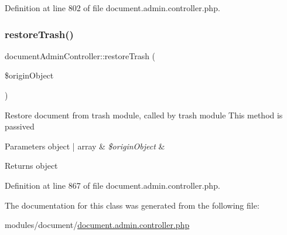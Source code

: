 Definition at line 802 of file document.\+admin.\+controller.\+php.

\mbox{\label{classdocumentAdminController_a3750ffc8b40a8bbd46f5ac455e65cb37}} 
\subsubsection{\texorpdfstring{restore\+Trash()}{restoreTrash()}}
{\footnotesize\ttfamily document\+Admin\+Controller\+::restore\+Trash (\begin{DoxyParamCaption}\item[{}]{\$origin\+Object }\end{DoxyParamCaption})}

Restore document from trash module, called by trash module This method is passived 
\begin{DoxyParams}[1]{Parameters}
object | array & {\em \$origin\+Object} & \\
\hline
\end{DoxyParams}
\begin{DoxyReturn}{Returns}
object 
\end{DoxyReturn}


Definition at line 867 of file document.\+admin.\+controller.\+php.



The documentation for this class was generated from the following file\+:\begin{DoxyCompactItemize}
\item 
modules/document/\hyperlink{document_8admin_8controller_8php}{document.\+admin.\+controller.\+php}\end{DoxyCompactItemize}
